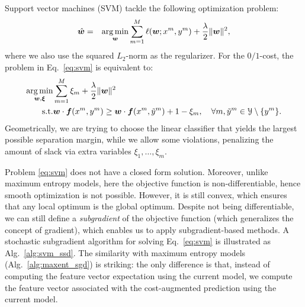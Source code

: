 Support vector machines (SVM) tackle the following optimization problem: 
\begin{eqnarray}\label{eq:svm} 
\hat{\boldsymbol{w}} &=& 
\operatorname*{arg\,min}_{\boldsymbol{w}} \sum_{m=1}^M \ell(\boldsymbol{w}; x^m, y^m)  + \frac{\lambda}{2} \|\boldsymbol{w}\|^2,
\end{eqnarray} 
where we also use the squared $L_2$-norm as the regularizer. 
For the $0/1$-cost, the problem in Eq.~\ref{eq:svm} is equivalent to: 
\begin{eqnarray}\label{eq:svm2} 
\operatorname*{arg\,min}_{\boldsymbol{w}, \boldsymbol{\xi}} & \sum_{m=1}^M \xi_m  + \frac{\lambda}{2} \|\boldsymbol{w}\|^2 \\
\text{s.t.} & \boldsymbol{w} \cdot \boldsymbol{f}(x^m,y^m) \ge \boldsymbol{w} \cdot \boldsymbol{f}(x^m,\tilde{y}^m) + 1 - \xi_m, \quad \forall m, \tilde{y}^m \in \mathcal{Y}\setminus \{y^m\}.
\end{eqnarray} 
Geometrically, we are trying to choose the linear classifier that yields the largest possible separation margin, 
while we allow some violations, penalizing the amount of slack via extra variables $\xi_1,\ldots,\xi_m$. 

Problem \ref{eq:svm} does not have a closed form solution. Moreover, unlike maximum entropy models, 
here the objective function is non-differentiable, hence 
smooth optimization is not possible. However, it is still convex, which ensures that any local optimum is the global optimum. 
Despite not being differentiable, we can still define a \emph{subgradient} of the objective function (which generalizes the 
concept of gradient), which enables us to apply subgradient-based methods. 
A stochastic subgradient algorithm for solving Eq.~\ref{eq:svm} is illustrated as Alg.~\ref{alg:svm_ssd}. 
The similarity with maximum entropy models (Alg.~\ref{alg:maxent_sgd}) is striking: the only difference is that, instead of computing the feature vector expectation 
using the current model, we compute the feature vector associated with
the cost-augmented prediction using the current model. 

